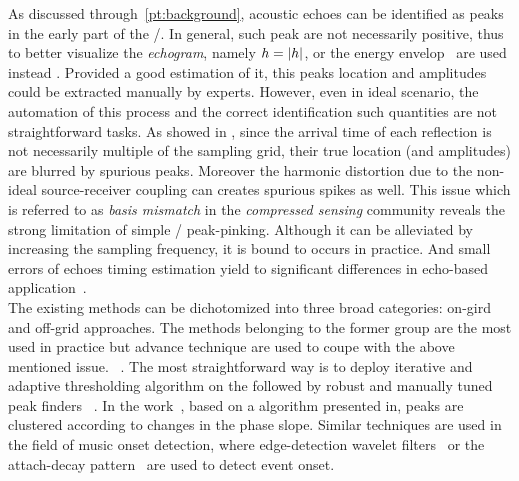 As discussed through~\cref{pt:background}, acoustic echoes can be identified as peaks in the early part of the \RIR/.
In general, such peak are not necessarily positive, thus to better visualize the \textit{echogram}, namely $h = |{h}|$, or the energy envelop~ are used instead%
.
Provided a good estimation of it, this peaks location and amplitudes could be extracted manually by experts.
However, even in ideal scenario, the automation of this process and the correct identification such quantities are not straightforward tasks.
As showed in , since the arrival time of each reflection is not necessarily multiple of the sampling grid, their true location (and amplitudes) are blurred by spurious peaks.
Moreover the harmonic distortion due to the non-ideal source-receiver coupling can creates spurious spikes as well.
This issue which is referred to as \textit{basis mismatch} in the \textit{compressed sensing} community reveals the strong limitation of simple \RIR/ peak-pinking.
Although it can be alleviated by increasing the sampling frequency, it is bound to occurs in practice.
And small errors of echoes timing estimation yield to significant differences in echo-based application~.
\\The existing methods can be dichotomized into three broad categories: on-gird and off-grid approaches.
The methods belonging to the former group are the most used in practice but advance technique are used to coupe with the above mentioned issue.
~.
The most straightforward way is to deploy iterative and adaptive thresholding algorithm on the followed by robust and manually tuned peak finders ~.
In the work~, based on a algorithm presented in, peaks are clustered according to changes in the phase slope.
Similar techniques are used in the field of music onset detection, where edge-detection wavelet filters~ or the attach-decay pattern~ are used to detect event onset.
